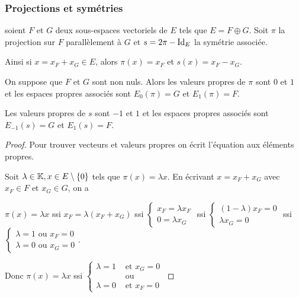 \subsubsection{Projections et symétries}

\begin{exemple}
    soient $F$ et $G$ deux sous-espaces vectoriels de $E$ tels que $E = F \oplus G$.
    Soit $\pi$ la projection sur $F$ parallèlement à $G$ et $s = 2 \pi - \operatorname{Id}_E$ la symétrie associée. 

    Ainsi si $x = x_F + x_G \in E$, alors $\pi(x) = x_F$ et $s(x) = x_F - x_G$.

    On suppose que $F$ et $G$ sont non nuls. Alors les valeurs propres de $\pi$ sont $0$ et $1$ 
    et les espaces propres associés sont $E_0(\pi) = G$ et $E_1(\pi) = F$.

    Les valeurs propres de $s$ sont $-1$ et $1$ et les espaces propres associés sont 
    $E_{-1}(s) = G$ et $E_1(s) = F$.


    \begin{proof} 
        Pour trouver vecteurs et valeurs propres on écrit l'équation aux éléments propres.

        Soit $\lambda \in \mathbb{K}, x \in E \setminus \{0\}$ tels que $\pi(x) = \lambda x$.
        En écrivant $x = x_F + x_G$ avec $x_F \in F$ et $x_G \in G$, on a
        
        $\pi(x) = \lambda x $ ssi $x_F = \lambda (x_F + x_G)$ ssi $\begin{cases}
        x_F = \lambda x_F \\
        0 = \lambda x_G
        \end{cases}$ ssi $\begin{cases}
        (1 - \lambda) x_F = 0 \\
        \lambda x_G = 0
        \end{cases}$ ssi $\begin{cases}
            \lambda = 1 \text{ ou } x_F = 0 \\
            \lambda = 0 \text{ ou } x_G = 0
        \end{cases}$.

        Donc $\pi(x) = \lambda x$ ssi $\begin{cases}
            \lambda = 1 &\text{ et } x_G = 0 \\
            & \text{ ou } \\
            \lambda = 0 &\text{ et } x_F = 0
        \end{cases}$


\end{proof}
\end{exemple}
